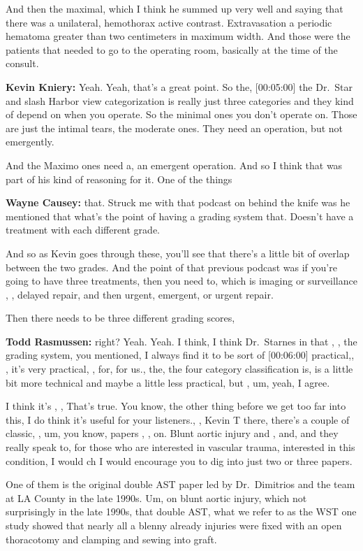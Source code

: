 \documentclass[
]{book}
\begin{document}
And then the maximal, which I think he summed up very well and saying
that there was a unilateral, hemothorax active contrast. Extravasation a
periodic hematoma greater than two centimeters in maximum width. And
those were the patients that needed to go to the operating room,
basically at the time of the consult.

\textbf{Kevin Kniery:} Yeah. Yeah, that's a great point. So the, {[}00:05:00{]}
the Dr.~Star and slash Harbor view categorization is really just three
categories and they kind of depend on when you operate. So the minimal
ones you don't operate on. Those are just the intimal tears, the
moderate ones. They need an operation, but not emergently.

And the Maximo ones need a, an emergent operation. And so I think that
was part of his kind of reasoning for it. One of the things

\textbf{Wayne Causey:} that. Struck me with that podcast on behind the knife
was he mentioned that what's the point of having a grading system that.
Doesn't have a treatment with each different grade.

And so as Kevin goes through these, you'll see that there's a little bit
of overlap between the two grades. And the point of that previous
podcast was if you're going to have three treatments, then you need to,
which is imaging or surveillance , , delayed repair, and then urgent,
emergent, or urgent repair.

Then there needs to be three different grading scores,

\textbf{Todd Rasmussen:} right? Yeah. Yeah. I think, I think Dr.~Starnes in
that , , the grading system, you mentioned, I always find it to be sort
of {[}00:06:00{]} practical,, , it's very practical, , for, for us., the,
the four category classification is, is a little bit more technical and
maybe a little less practical, but , um, yeah, I agree.

I think it's , , That's true. You know, the other thing before we get
too far into this, I do think it's useful for your listeners., , Kevin T
there, there's a couple of classic, , um, you know, papers , , on. Blunt
aortic injury and , and, and they really speak to, for those who are
interested in vascular trauma, interested in this condition, I would ch
I would encourage you to dig into just two or three papers.

One of them is the original double AST paper led by Dr.~Dimitrios and
the team at LA County in the late 1990s. Um, on blunt aortic injury,
which not surprisingly in the late 1990s, that double AST, what we refer
to as the WST one study showed that nearly all a blenny already injuries
were fixed with an open thoracotomy and clamping and sewing into graft.
\end{document}
